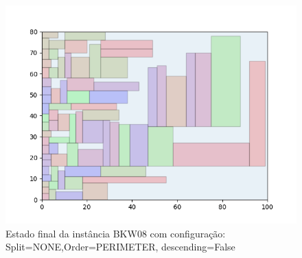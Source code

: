 \begin{figure}[H]
    \centering
    \caption[]{Estado final da instância BKW08 com configuração: Split=NONE,Order=PERIMETER, descending=False}
    \label{fig:bkw08-none-perimeter-false}
    \includegraphics[scale=0.5]{output/figures/bkw/bkw08/none/perimeter/false/00}
\end{figure}